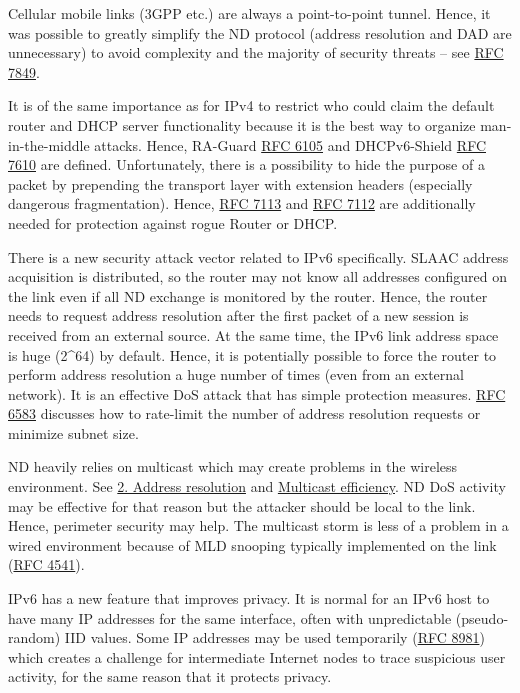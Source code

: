 \documentclass[
]{article}
\begin{document}
Cellular mobile links (3GPP etc.) are always a point-to-point tunnel.
Hence, it was possible to greatly simplify the ND protocol (address
resolution and DAD are unnecessary) to avoid complexity and the majority
of security threats -- see
\href{https://www.rfc-editor.org/info/rfc7849}{RFC 7849}.

It is of the same importance as for IPv4 to restrict who could claim the
default router and DHCP server functionality because it is the best way
to organize man-in-the-middle attacks. Hence, RA-Guard
\href{https://www.rfc-editor.org/info/rfc6105}{RFC 6105} and
DHCPv6-Shield \href{https://www.rfc-editor.org/info/rfc7610}{RFC 7610}
are defined. Unfortunately, there is a possibility to hide the purpose
of a packet by prepending the transport layer with extension headers
(especially dangerous fragmentation). Hence,
\href{https://www.rfc-editor.org/info/rfc7113}{RFC 7113} and
\href{https://www.rfc-editor.org/info/rfc7112}{RFC 7112} are
additionally needed for protection against rogue Router or DHCP.

There is a new security attack vector related to IPv6 specifically.
SLAAC address acquisition is distributed, so the router may not know all
addresses configured on the link even if all ND exchange is monitored by
the router. Hence, the router needs to request address resolution after
the first packet of a new session is received from an external source.
At the same time, the IPv6 link address space is huge (2\^{}64) by
default. Hence, it is potentially possible to force the router to
perform address resolution a huge number of times (even from an external
network). It is an effective DoS attack that has simple protection
measures. \href{https://www.rfc-editor.org/info/rfc6583}{RFC 6583}
discusses how to rate-limit the number of address resolution requests or
minimize subnet size.

ND heavily relies on multicast which may create problems in the wireless
environment. See \hyperref[address-resolution]{2. Address resolution}
and
\href{https://datatracker.ietf.org/doc/draft-vyncke-6man-mcast-not-efficient}{Multicast
efficiency}. ND DoS activity may be effective for that reason but the
attacker should be local to the link. Hence, perimeter security may
help. The multicast storm is less of a problem in a wired environment
because of MLD snooping typically implemented on the link
(\href{https://www.rfc-editor.org/info/rfc4541}{RFC 4541}).

IPv6 has a new feature that improves privacy. It is normal for an IPv6
host to have many IP addresses for the same interface, often with
unpredictable (pseudo-random) IID values. Some IP addresses may be used
temporarily (\href{https://www.rfc-editor.org/info/rfc8981}{RFC 8981})
which creates a challenge for intermediate Internet nodes to trace
suspicious user activity, for the same reason that it protects privacy.
\end{document}
